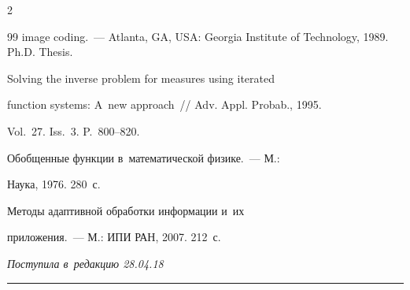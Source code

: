 \begin{multicols}{2}
{{\begin{thebibliography}{99}
image coding.~--- Atlanta, GA, USA: Georgia Institute of Technology, 1989. Ph.D. Thesis.




   Solving the inverse problem for measures using iterated 


function systems: A~new approach~// Adv. Appl. Probab., 1995. 


Vol.~27. Iss.~3. P.~800--820.




   Обобщенные функции в~математической физике.~--- М.: 


Наука, 1976. 280~с.




   Методы адаптивной обработки информации и~их  


приложения.~--- М.: ИПИ РАН, 2007. 212~с.





 \end{thebibliography}





 }


 }





\end{multicols}





\vspace*{-6pt}





\hfill{\small\textit{Поступила в~редакцию 28.04.18}}





\vspace*{6pt}















\hrule





